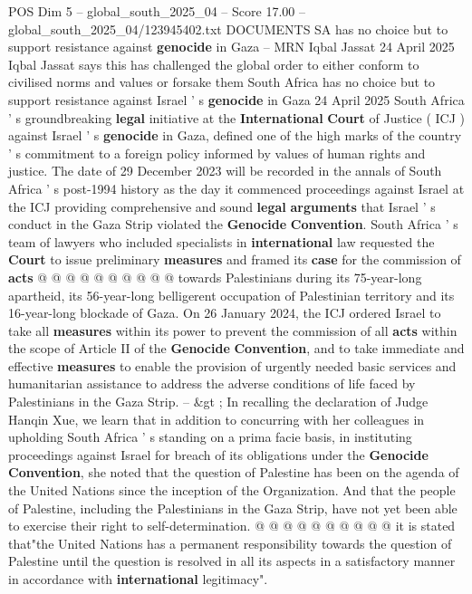 \begin{textsample}{POS Dim 5 – global\_south\_2025\_04 – Score 17.00 – global\_south\_2025\_04/123945402.txt}  \label{ex:f5_pos_084}
DOCUMENTS SA has no choice but to support resistance against \textbf{genocide} in Gaza -- MRN Iqbal Jassat 24 April 2025 Iqbal Jassat says this has challenged the global order to either conform to civilised norms and values or forsake them South Africa has no choice but to support resistance against Israel ' s \textbf{genocide} in Gaza 24 April 2025 South Africa ' s groundbreaking \textbf{legal} initiative at the \textbf{International} \textbf{Court} of Justice ( ICJ ) against Israel ' s \textbf{genocide} in Gaza, defined one of the high marks of the country ' s commitment to a foreign policy informed by values of human rights and justice.
The date of 29 December 2023 will be recorded in the annals of South Africa ' s post-1994 history as the day it commenced proceedings against Israel at the ICJ providing comprehensive and sound \textbf{legal} \textbf{arguments} that Israel ' s conduct in the Gaza Strip violated the \textbf{Genocide} \textbf{Convention}.
South Africa ' s team of lawyers who included specialists in \textbf{international} law requested the \textbf{Court} to issue preliminary \textbf{measures} and framed its \textbf{case} for the commission of \textbf{acts} @ @ @ @ @ @ @ @ @ @ towards Palestinians during its 75-year-long apartheid, its 56-year-long belligerent occupation of Palestinian territory and its 16-year-long blockade of Gaza.
On 26 January 2024, the ICJ ordered Israel to take all \textbf{measures} within its power to prevent the commission of all \textbf{acts} within the scope of Article II of the \textbf{Genocide} \textbf{Convention}, and to take immediate and effective \textbf{measures} to enable the provision of urgently needed basic services and humanitarian assistance to address the adverse conditions of life faced by Palestinians in the Gaza Strip. -- \&gt ; In recalling the declaration of Judge Hanqin Xue, we learn that in addition to concurring with her colleagues in upholding South Africa ' s standing on a prima facie basis, in instituting proceedings against Israel for breach of its obligations under the \textbf{Genocide} \textbf{Convention}, she noted that the question of Palestine has been on the agenda of the United Nations since the inception of the Organization.
And that the people of Palestine, including the Palestinians in the Gaza Strip, have not yet been able to exercise their right to self-determination. @ @ @ @ @ @ @ @ @ @ it is stated that"the United Nations has a permanent responsibility towards the question of Palestine until the question is resolved in all its aspects in a satisfactory manner in accordance with \textbf{international} legitimacy".

\end{textsample}
